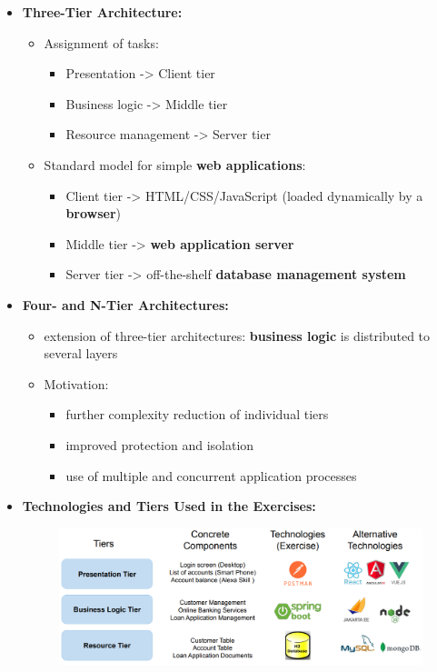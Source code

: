\documentclass[ieeetran]{article}
\begin{document}
\begin{itemize}
\item \textbf{Three-Tier Architecture:}
	\begin{itemize}
	  \item Assignment of tasks:
		  \begin{itemize}
		   \item Presentation -> Client tier
	\item Business logic -> Middle tier
	\item Resource management -> Server tier
		  \end{itemize}
	\item Standard model for simple \textbf{web applications}:
		\begin{itemize}
		  \item Client tier -> HTML/CSS/JavaScript (loaded dynamically by a \textbf{browser})
		\item Middle tier -> \textbf{web application server}
		\item Server tier -> off-the-shelf \textbf{database management system}
		\end{itemize}
	\end{itemize}

\item \textbf{Four- and N-Tier Architectures:}
\begin{itemize}
  \item extension of three-tier architectures: \textbf{business logic} is distributed to several layers
\item Motivation:
	\begin{itemize}
	  \item further complexity reduction of individual tiers
	\item improved protection and isolation
	\item use of multiple and concurrent application processes
	\end{itemize}
\end{itemize}

\item \textbf{Technologies and Tiers Used in the Exercises:}
	\begin{figure}[h!]
	  \centering
	  \includegraphics[width=0.7\linewidth]{techstiersex.png}
	  \label{fig:techstiersex_png}
	\end{figure}


\end{itemize}
\end{document}
